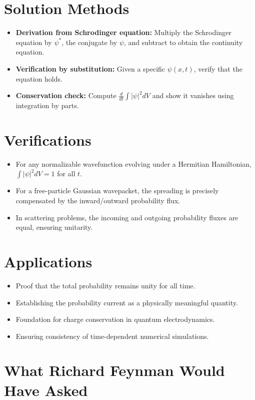 \section*{Solution Methods}

\begin{itemize}
    \item \textbf{Derivation from Schrodinger equation:} Multiply the Schrodinger equation by $\psi^*$, the conjugate by $\psi$, and subtract to obtain the continuity equation.
    \item \textbf{Verification by substitution:} Given a specific $\psi(x,t)$, verify that the equation holds.
    \item \textbf{Conservation check:} Compute $\frac{d}{dt}\int|\psi|^2 dV$ and show it vanishes using integration by parts.
\end{itemize}
\section*{Verifications}

\begin{itemize}
    \item For any normalizable wavefunction evolving under a Hermitian Hamiltonian, $\int|\psi|^2 dV = 1$ for all $t$.
    \item For a free-particle Gaussian wavepacket, the spreading is precisely compensated by the inward/outward probability flux.
    \item In scattering problems, the incoming and outgoing probability fluxes are equal, ensuring unitarity.
\end{itemize}
\section*{Applications}

\begin{itemize}
    \item Proof that the total probability remains unity for all time.
    \item Establishing the probability current as a physically meaningful quantity.
    \item Foundation for charge conservation in quantum electrodynamics.
    \item Ensuring consistency of time-dependent numerical simulations.
\end{itemize}
\section*{What Richard Feynman Would Have Asked}

